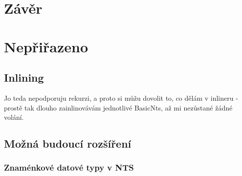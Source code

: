 \documentclass[10pt,a4paper,notitlepage]{report}
\begin{document}
\chapter{Závěr}



\chapter{Nepřiřazeno}
\section{Inlining}
Jo teda nepodporuju rekurzi, a proto si můžu dovolit to, co dělám v inlineru - prostě tak dlouho zainlinovávám jednotlivé BasicNts, až mi nezůstané žádné volání.

\section{Možná budoucí rozšíření}

\subsection{Znaménkové datové typy v NTS}


\tableofcontents

\printbibliography
\end{document}
